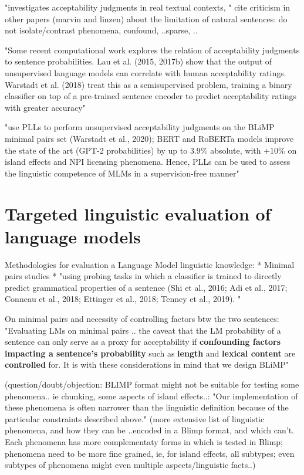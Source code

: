 "investigates acceptability judgments in real textual contexts, " \citep{lau2020furiously} 
cite criticism in other papers (marvin and linzen) about the limitation of natural sentences: do not isolate/contrast phenomena, confound, ..sparse, ..

"Some recent computational work explores the
relation of acceptability judgments to sentence
probabilities. Lau et al. (2015, 2017b) show that
the output of unsupervised language models
can correlate with human acceptability ratings.
Warstadt et al. (2018) treat this as a semisupervised problem, training a binary classifier
on top of a pre-trained sentence encoder to
predict acceptability ratings with greater accuracy"\citep{lau2020furiously} 

\citet{salazar2020masked}  "use PLLs to perform unsupervised acceptability judgments on the BLiMP minimal pairs set (Warstadt et al., 2020); BERT and RoBERTa models improve the state of the art (GPT-2 probabilities)
by up to 3.9\% absolute, with +10\% on island effects and NPI licensing phenomena. Hence, PLLs can be used to assess the linguistic competence of
MLMs in a supervision-free manner"


\section{Targeted linguistic evaluation of language models}

Methodologies for evaluation a Language Model linguistic knowledge:
* Minimal pairs studies \citep{warstadt2020blimp, linzen2016assessing, marvin2018targeted, wilcox2018rnn}
* "using probing tasks in which a classifier is trained to directly predict grammatical properties of a sentence  (Shi et al., 2016; Adi et al.,
2017; Conneau et al., 2018; Ettinger et al., 2018;
Tenney et al., 2019). "  \citep{warstadt2020blimp}	

On minimal pairs and necessity of controlling factors btw the two sentences:
"Evaluating LMs on minimal pairs .. the caveat that the LM probability of a sentence can only serve as a proxy for acceptability if \textbf{confounding factors impacting a sentence’s probability} such as \textbf{length} and \textbf{lexical content} are \textbf{controlled} for. It is with these considerations in mind that we design BLiMP"

(question/doubt/objection: BLIMP format might not be suitable for testing some phenomena.. ie chunking, some aspects of island effects..: "Our implementation of these phenomena is often
narrower than the linguistic definition because of the particular constraints described above."  \citep{warstadt2020blimp}	
(more extensive list of linguistic phenomena, and how they can be ..encoded in a Blimp format, and which can't. Each phenomena has more complementaty forms in which is tested in Blimp; phenomena need to be more fine grained, ie, for island effects, all subtypes; even subtypes of phenomena might even multiple aspects/linguistic facts..)

